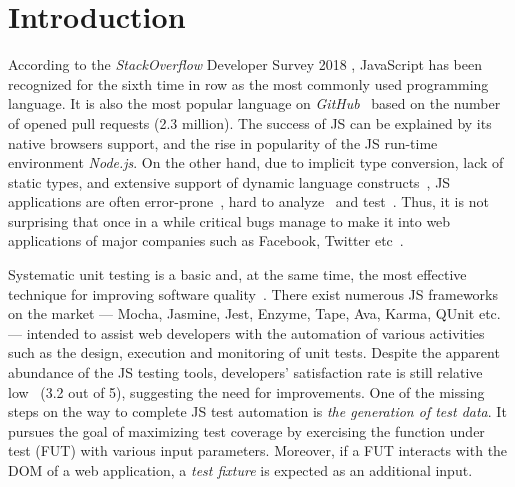 \section{Introduction}
\label{sec.intro}

According to the \emph{StackOverflow} Developer Survey 2018 \cite{stackoverflow2018}, JavaScript has been recognized for the sixth time in row as the most commonly used programming language. It is also the most popular language on \emph{GitHub}~\cite{guthub2017} based on the number of opened pull requests (2.3 million). The success of JS can be explained by its native browsers support, and the rise in popularity of the JS run-time environment \emph{Node.js}. On the other hand, due to implicit type conversion, lack of static types, and extensive support of dynamic language constructs~\cite{richards2010analysis}, JS applications are often error-prone~\cite{frolin:TSE16}, hard to analyze~\cite{andreasen2017survey, sun2017analysis} and test~\cite{mesbah2015advances}. Thus, it is not surprising that once in a while critical bugs manage to make it into web applications of major companies such as Facebook, Twitter etc~\cite{bugstories2017}.

Systematic unit testing is a basic and, at the same time, the most effective technique for improving software quality~\cite{martin2009clean}. There exist numerous JS frameworks on the market --- Mocha, Jasmine, Jest, Enzyme, Tape, Ava, Karma, QUnit etc. --- intended to assist web developers with the automation of various  activities such as the design, execution and monitoring of unit tests. Despite the apparent abundance of the JS testing tools, developers' satisfaction rate is still relative low~\cite{stateJS2017} (3.2 out of 5), suggesting the need for improvements. One of the missing steps on the way to complete JS test automation is \emph{the generation of test data}. It pursues the goal of maximizing test coverage by exercising the function under test (FUT) with various input parameters. Moreover, if a FUT interacts with the DOM of a web application, a \emph{test fixture} is expected as an additional input.

